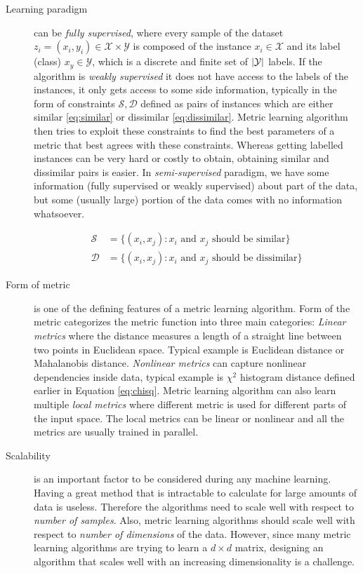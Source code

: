 \documentclass[12pt,a4paper]{report}
\begin{document}
\begin{description}
\item [Learning paradigm] can be \textit{fully supervised}, where every sample of the dataset $z_i=(x_i,y_i) \in \mathcal{X} \times \mathcal{Y}$ is composed of the instance $x_i \in \mathcal{X}$ and its label (class) $x_y \in \mathcal{Y}$, which is a discrete and finite set of $\left|{\mathcal{Y}}\right|$ labels. If the algorithm is \textit{weakly supervised} it does not have access to the labels of the instances, it only gets access to some side information, typically in the form of constraints $\mathcal{S}, \mathcal{D}$ defined as pairs of instances which are either similar \ref{eq:similar} or dissimilar \ref{eq:dissimilar}. Metric learning algorithm then tries to exploit these constraints to find the best parameters of a metric that best agrees with these constraints. Whereas getting labelled instances can be very hard or costly to obtain, obtaining similar and dissimilar pairs is easier. In \textit{semi-supervised} paradigm, we have some information (fully supervised or weakly supervised) about part of the data, but some (usually large) portion of the data comes with no information whatsoever.

\begin{align}
\mathcal{S} &= \lbrace(x_i,x_j): x_i \text{ and } x_j \text{ should be similar} \rbrace \label{eq:similar} \\
\mathcal{D} &= \lbrace(x_i,x_j): x_i \text{ and } x_j \text{ should be dissimilar} \rbrace \label{eq:dissimilar}
\end{align}

\item [Form of metric] is one of the defining features of a metric learning algorithm. Form of the metric categorizes the metric function into three main categories: \textit{Linear metrics} where the distance measures a length of a straight line between two points in Euclidean space. Typical example is Euclidean distance or Mahalanobis distance. \textit{Nonlinear metrics} can capture nonlinear dependencies inside data, typical example is $\chi^2$ histogram distance defined earlier in Equation \ref{eq:chisq}. Metric learning algorithm can also learn multiple \textit{local metrics} where different metric is used for different parts of the input space. The local metrics can be linear or nonlinear and all the metrics are usually trained in parallel.

\item [Scalability] is an important factor to be considered during any machine learning. Having a great method that is intractable to calculate for large amounts of data is useless. Therefore the algorithms need to scale well with respect to \textit{number of samples}. Also, metric learning algorithms should scale well with respect to \textit{number of dimensions} of the data. However, since many metric learning algorithms are trying to learn a $d \times d$ matrix, designing an algorithm that scales well with an increasing dimensionality is a challenge.


\end{description}
\end{document}
